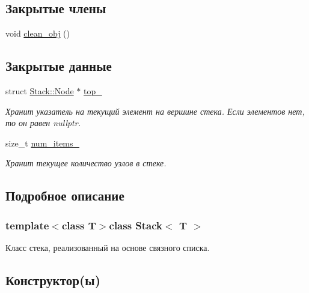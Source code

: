 \subsection*{Закрытые члены}
\begin{DoxyCompactItemize}
\item 
void \hyperlink{class_stack_abc666f64e68c132007ba8203afe0dbe6}{clean\+\_\+obj} ()
\end{DoxyCompactItemize}
\subsection*{Закрытые данные}
\begin{DoxyCompactItemize}
\item 
struct \hyperlink{struct_stack_1_1_node}{Stack\+::\+Node} $\ast$ \hyperlink{class_stack_a4fa8fe1a2a6ff42f954d6a3c0d29d6e0}{top\+\_\+}
\begin{DoxyCompactList}\small\item\em Хранит указатель на текущий элемент на вершине стека. Если элементов нет, то он равен nullptr. \end{DoxyCompactList}\item 
size\+\_\+t \hyperlink{class_stack_a96988dc68a1b439d26b8782ea63bd7b8}{num\+\_\+items\+\_\+}
\begin{DoxyCompactList}\small\item\em Хранит текущее количество узлов в стеке. \end{DoxyCompactList}\end{DoxyCompactItemize}


\subsection{Подробное описание}
\subsubsection*{template$<$class T$>$class Stack$<$ T $>$}

Класс стека, реализованный на основе связного списка. 

\subsection{Конструктор(ы)}
\hypertarget{class_stack_aefee698059467258bbd79045aca62a63}{}

